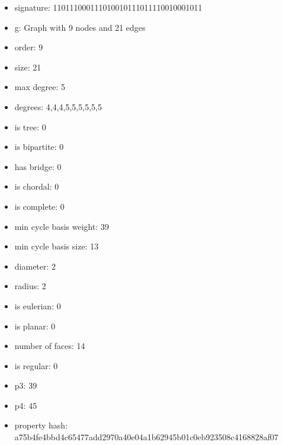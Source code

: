 \newpage
\begin{figure}
\end{figure}
\begin{itemize}
\item signature: 110111000111010010111011110010001011
\item g: Graph with 9 nodes and 21 edges
\item order: 9
\item size: 21
\item max degree: 5
\item degrees: 4,4,4,5,5,5,5,5,5
\item is tree: 0
\item is bipartite: 0
\item has bridge: 0
\item is chordal: 0
\item is complete: 0
\item min cycle basis weight: 39
\item min cycle basis size: 13
\item diameter: 2
\item radius: 2
\item is eulerian: 0
\item is planar: 0
\item number of faces: 14
\item is regular: 0
\item p3: 39
\item p4: 45
\item property hash: a75b4fe4bbd4c65477add2970a40e04a1b62945b01c0eb923508c4168828af07
\end{itemize}
\newpage
